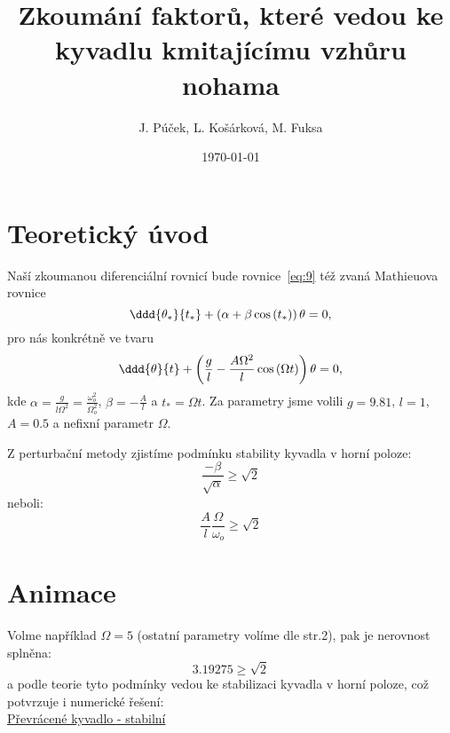 \documentclass{beamer}
\title[Převrácené kyvadlo]{Zkoumání faktorů, které vedou ke kyvadlu kmitajícímu vzhůru nohama}
\author[J. P., L. K., M. F.]{J. Púček, L. Košárková, M. Fuksa}
\institute[Univerzita Karlova]{Univerzita Karlova, Česká republika}
\date{\today}
\begin{document}
\begin{frame}
\titlepage
\end{frame}

\section{Teoretický úvod}
\label{sec:uvod}

\begin{frame}
\begin{center}
			Naší zkoumanou diferenciální rovnicí bude rovnice~\eqref{eq:9} též zvaná Mathieuova rovnice
		\begin{equation}
			\label{eq:9}
			\ddd{\theta_{*}}{t_{*}}
			+
			\left(
			\alpha
			+
			\beta \cos \left( t_{*} \right)
			\right)
			\theta
			=
			0
			,
		\end{equation}
			pro nás konkrétně ve tvaru
		\begin{equation}
			\label{eq:10}
			\ddd{\theta}{t}
			+
			\left(
			\frac{g}{l}
			-
			\frac{A \Omega^2}{l} \cos \left( \Omega t \right)
			\right)
			\theta
			=
			0
			,
		\end{equation}
			kde $\alpha=\frac{g}{l\Omega^2}=\frac{\omega_{o}^2}{\Omega_{o}^2}$, $ \beta=-\frac{A}{l}$ a $t_{*}=\Omega t$. Za parametry jsme volili $g=9.81$, $l=1$,  $A=0.5$ a nefixní parametr $\Omega$.
		\end{center}
\end{frame}

\begin{frame}
	Z perturbační metody zjistíme podmínku stability kyvadla v horní poloze: 
	\begin{equation*}
		\frac{-\beta}{\sqrt{\alpha}}\geq \sqrt{2}
	\end{equation*}
	neboli:
	\begin{equation*}
	\frac{A}{l}\frac{\Omega}{\omega_{o}}\geq \sqrt{2}
	\end{equation*}	
\end{frame}

\section{Animace}
\label{sec:animace}

\begin{frame}
\begin{center}
	Volme například $\Omega=5$ (ostatní parametry volíme dle str.2), pak je nerovnost splněna:
\begin{equation*}
	3.19275 \geq \sqrt{2}
\end{equation*}	
	a podle teorie tyto podmínky vedou ke stabilizaci kyvadla v horní poloze, což potvrzuje i numerické řešení: 
\\

\href{run:./animace.mp4}{Převrácené kyvadlo - stabilní}
\end{center}
\end{frame}
\end{document}
